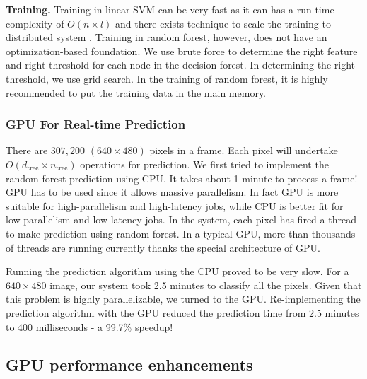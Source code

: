 \textbf{Training.} Training in linear SVM can be very fast as it can has a run-time complexity of $O(n\times l)$ and there exists technique to scale the training to distributed system . Training in random forest, however, does not have an optimization-based foundation. We use brute force to determine the right feature and right threshold for each node in the decision forest. In determining the right threshold, we use grid search. In the training of random forest, it is highly recommended to put the training data in the main memory. 


\subsubsection{GPU For Real-time Prediction} 
There are $307,200$ $(640\times 480)$ pixels in a frame. Each pixel will undertake $O(d_{\text{tree}}\times n_{\text{tree}})$ operations for prediction. We first tried to implement the random forest prediction using CPU. It takes about 1 minute to process a frame! GPU has to be used since it allows massive parallelism. In fact GPU is more suitable for high-parallelism and high-latency jobs, while CPU is better fit for low-parallelism and low-latency jobs. In the system, each pixel has fired a thread to make prediction using random forest. In a typical GPU, more than thousands of threads are running currently thanks the special architecture of GPU.   


Running the prediction algorithm using the CPU proved to be very slow. For a $640\times480$ image, our system took 2.5 minutes to classify all the pixels. Given that this problem is highly parallelizable, we turned to the GPU. Re-implementing the prediction algorithm with the GPU reduced the prediction time from 2.5 minutes to 400 milliseconds - a 99.7\% speedup!


\subsection{GPU performance enhancements}